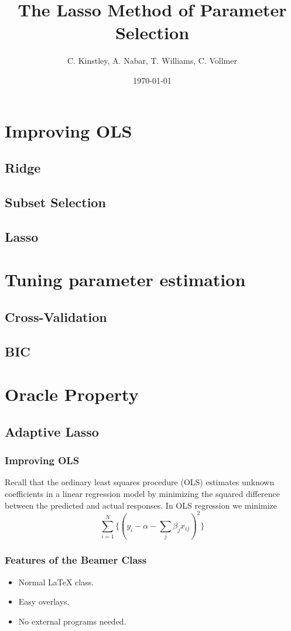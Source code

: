 \documentclass{beamer}
\title{The Lasso Method of Parameter Selection}
\author{C. Kinstley, A. Nabar, T. Williams, C. Vollmer}
\date{\today}
\begin{document}
\frame{\titlepage}

\section[Outline]{}
\frame{\tableofcontents}

\section{Improving OLS}
\subsection{Ridge}
\subsection{Subset Selection}
\subsection{Lasso}

\section{Tuning parameter estimation}
\subsection{Cross-Validation}
\subsection{BIC}

\section{Oracle Property}
\subsection{Adaptive Lasso}

\frame
{
\frametitle{Improving OLS}
	Recall that the ordinary least squares procedure (OLS) estimates unknown coefficients in a linear regression model by minimizing the squared difference between the predicted and actual responses.
	In OLS regression we minimize
	\begin{equation*}
\sum_{i=1}^N\{(y_i - \alpha-\sum_j\beta_jx_{ij} )^2 \}
	\end{equation*}
}


\frame
{
  \frametitle{Features of the Beamer Class}

  \begin{itemize}
  \item<1-> Normal LaTeX class.
  \item<2-> Easy overlays.
  \item<3-> No external programs needed.      
  \end{itemize}
}
\end{document}
